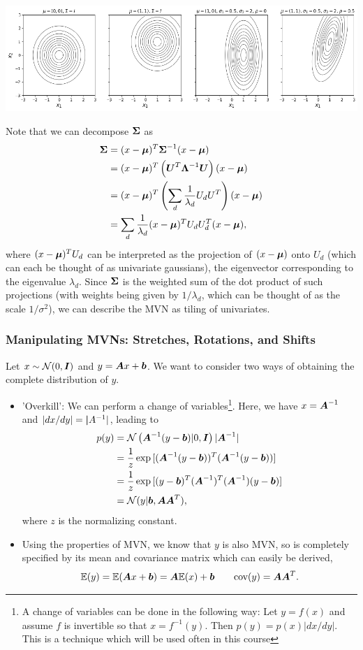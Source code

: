 \documentclass{article}
\begin{document}
\begin{center}
\includegraphics[width=\textwidth]{MVN_contour.png}
\end{center}

Note that we can decompose $\boldsymbol{\Sigma}$ as
\begin{align*}
\boldsymbol{\Sigma} &= (x-\boldsymbol{\mu})^T\boldsymbol{\Sigma}^{-1}(x-\boldsymbol{\mu}) \\
&= (x-\boldsymbol{\mu})^T\left(\boldsymbol{U}^T \boldsymbol{\Lambda}^{-1}\boldsymbol{U}\right)(x-\boldsymbol{\mu}) \\
&= (x-\boldsymbol{\mu})^T\left(\sum_d{\frac{1}{\lambda_d} U_d U^T}\right)(x-\boldsymbol{\mu}) \\
&= \sum_d{\frac{1}{\lambda_d}(x-\boldsymbol{\mu})^T U_d U_d^T (x-\boldsymbol{\mu})},
\end{align*}
where $(x-\boldsymbol{\mu})^T U_d$ can be interpreted as the projection of $(x-\boldsymbol{\mu})$ onto $U_d$ (which can each be thought of as univariate gaussians), the eigenvector corresponding to the eigenvalue $\lambda_d$. Since $\boldsymbol{\Sigma}$ is the weighted sum of the dot product of such projections (with weights being given by $1/\lambda_d$, which can be thought of as the scale $1/\sigma^2$), we can describe the MVN as tiling of univariates.

\subsubsection{Manipulating MVNs: Stretches, Rotations, and Shifts}
Let $x\sim\mathcal{N}(0,\boldsymbol{I})$ and $y = \boldsymbol{A} x + \boldsymbol{b}$. We want to consider two ways of obtaining the complete distribution of $y$.

\begin{itemize}
\item 'Overkill': We can perform a change of variables\footnote{A change of variables can be done in the following way: Let $y=f(x)$ and assume $f$ is invertible so that $x=f^{-1}(y)$. Then $p(y) = p(x)|dx/dy|$.  This is a technique which will be used often in this course}. Here, we have $x = \boldsymbol{A}^{-1}$ and $|dx/dy| = \boldsymbol{|}A^{-1}|$, leading to
\begin{align*}
p(y) &= \mathcal{N}\left(\boldsymbol{A}^{-1}(y-\boldsymbol{b})|0,\boldsymbol{I}\right)|\boldsymbol{A}^{-1}| \\
&= \frac{1}{z}\exp{[(\boldsymbol{A}^{-1}(y-\boldsymbol{b}))^T(\boldsymbol{A}^{-1}(y-\boldsymbol{b}))]} \\
&= \frac{1}{z}\exp{[(y-\boldsymbol{b})^T(\boldsymbol{A}^{-1})^T(\boldsymbol{A}^{-1})(y-\boldsymbol{b})]} \\
&= \mathcal{N}(y|\boldsymbol{b},\boldsymbol{A}\boldsymbol{A}^T),
\end{align*}
where $z$ is the normalizing constant.
\item Using the properties of MVN, we know that $y$ is also MVN, so is completely specified by its mean and covariance matrix which can easily be derived,
$$ \mathbb{E}(y) = \mathbb{E}(\boldsymbol{A} x + \boldsymbol{b}) = \boldsymbol{A} \mathbb{E}(x) + \boldsymbol{b} \quad\quad \text{cov}(y) = \boldsymbol{A} \boldsymbol{A}^T. $$
\end{itemize}
\end{document}
